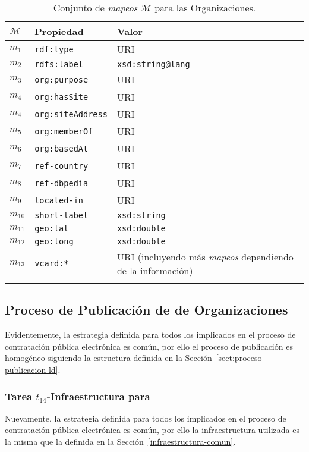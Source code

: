 \begin{longtable}[c]{|p{2cm}|p{8cm}|p{4cm}|} 
\hline
  \textbf{$\mathcal{M}$} &  \textbf{Propiedad} & \textbf{Valor} \\\hline
\endhead
 $m_1$ & \texttt{rdf:type} & \gls{URI} \\ \hline
 $m_2$ & \texttt{rdfs:label} & \texttt{xsd:string@lang}  \\ \hline
 $m_3$ & \texttt{org:purpose} & URI \\ \hline
 $m_4$ & \texttt{org:hasSite} & URI \\ \hline
 $m_4$ & \texttt{org:siteAddress} & URI  \\ \hline
 $m_5$ & \texttt{org:memberOf} & URI \\ \hline
 $m_6$ & \texttt{org:basedAt} & URI  \\ \hline
 $m_7$ & \texttt{ref-country} & URI \\ \hline  
 $m_8$ & \texttt{ref-dbpedia} & URI \\ \hline
 $m_9$ & \texttt{located-in}  & URI \\ \hline
 $m_{10}$ & \texttt{short-label}  & \texttt{xsd:string} \\ \hline   
 $m_{11}$ & \texttt{geo:lat}  & \texttt{xsd:double} \\ \hline
 $m_{12}$ & \texttt{geo:long}  & \texttt{xsd:double} \\ \hline   
 $m_{13}$ & \texttt{vcard:*}  & URI (incluyendo más \textit{mapeos} dependiendo de la información) \\ \hline         
\hline
\caption{Conjunto de \textit{mapeos} $\mathcal{M}$ para las Organizaciones.}\label{table:orgs-mappings}\\    
\end{longtable}

\subsection{Proceso de Publicación de \linkeddata de Organizaciones}
Evidentemente, la estrategia definida para todos los \datasets implicados en el proceso de contratación pública 
electrónica es común, por ello el proceso de publicación es homogéneo siguiendo la estructura definida 
en la Sección~\ref{sect:proceso-publicacion-ld}.

\subsubsection{Tarea $t_{14}$-Infraestructura para \linkeddata}
Nuevamente, la estrategia definida para todos los \datasets implicados en el proceso de contratación pública 
electrónica es común, por ello la infraestructura utilizada es la misma que la definida 
en la Sección~\ref{infraestructura-comun}.


